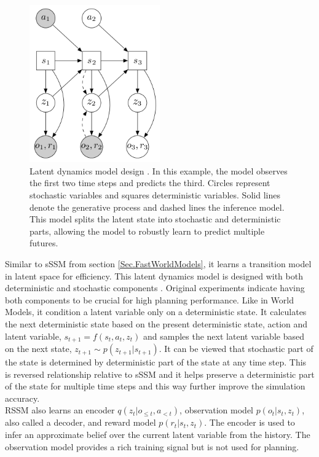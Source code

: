 \begin{figure}[H]
\includegraphics[width=0.5\textwidth,keepaspectratio]{figures/PlaNet/model.png}
\caption[PlaNet latent dynamics model design]{Latent dynamics model design \protect\cite{Algo.PlaNet}. In this example, the model observes the first two time steps and predicts the third. Circles represent stochastic variables and squares deterministic variables. Solid lines denote the generative process and dashed lines the inference model. This model splits the latent state into stochastic and deterministic parts, allowing the model to robustly learn to predict multiple futures.}
\label{Fig.PlaNetModelDesigne}
\end{figure}

Similar to sSSM from section \ref{Sec.FastWorldModels}, it learns a transition model in latent space for efficiency. This latent dynamics model is designed with both deterministic and stochastic components \cite{Algo.FastGenerativeModels}. Original experiments indicate having both components to be crucial for high planning performance. Like in World Models, it condition a latent variable only on a deterministic state. It calculates the next deterministic state based on the present deterministic state, action and latent variable, $s_{t+1} = f(s_t, a_t, z_t)$ and samples the next latent variable based on the next state, $z_{t+1} \sim p(z_{t+1}|s_{t+1})$. It can be viewed that stochastic part of the state is determined by deterministic part of the state at any time step. This is reversed relationship relative to sSSM and it helps preserve a deterministic part of the state for multiple time steps and this way further improve the simulation accuracy. \\
RSSM also learns an encoder $q(z_t | o_{\leqslant t}, a_{< t})$, observation model $p(o_t | s_t, z_t)$, also called a decoder, and reward model $p(r_t | s_t, z_t)$. The encoder is used to infer an approximate belief over the current latent variable from the history. The observation model provides a rich training signal but is not used for planning.


